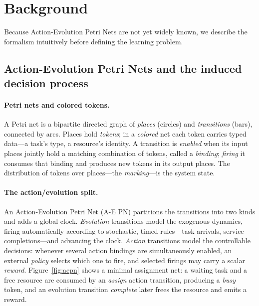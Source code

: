 \documentclass[review,authoryear,3p,times]{elsarticle}
\begin{document}
\section{Background}
\label{sec:background}

Because Action-Evolution Petri Nets are not yet widely known, we describe the
formalism intuitively before defining the learning problem.

\subsection{Action-Evolution Petri Nets and the induced decision process}

\paragraph{Petri nets and colored tokens.} A Petri net is a bipartite directed
graph of \emph{places} (circles) and \emph{transitions} (bars), connected by
arcs. Places hold \emph{tokens}; in a \emph{colored} net each token carries
typed data---a task's type, a resource's identity. A transition is
\emph{enabled} when its input places jointly hold a matching combination of
tokens, called a \emph{binding}; \emph{firing} it consumes that binding and
produces new tokens in its output places. The distribution of tokens over
places---the \emph{marking}---is the system state.

\paragraph{The action/evolution split.} An Action-Evolution Petri Net (A-E PN)
\citep{aepn2023} partitions the transitions into two kinds and adds a global
clock. \emph{Evolution} transitions model the exogenous dynamics, firing
automatically according to stochastic, timed rules---task arrivals, service
completions---and advancing the clock. \emph{Action} transitions model the
controllable decisions: whenever several action bindings are simultaneously
enabled, an external \emph{policy} selects which one to fire, and selected
firings may carry a scalar \emph{reward}. Figure~\ref{fig:aepn} shows a minimal
assignment net: a waiting task and a free resource are consumed by an
\emph{assign} action transition, producing a \emph{busy} token, and an evolution
transition \emph{complete} later frees the resource and emits a reward.
\end{document}
